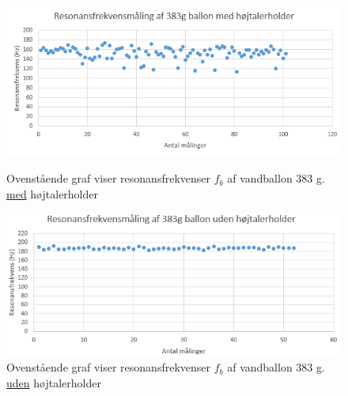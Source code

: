 {\begin{figure}[htbp]
  \begin{minipage}[b]{1\linewidth}
    \centering
    \includegraphics[width=\linewidth]{ballon383g(m_holder)}
    \caption{Ovenstående graf viser resonansfrekvenser $f_{b}$  af vandballon 383 g. \underline{med} højtalerholder}
    \label{fig:ballon216g(m_holder)}
    \label{fig:ballon383g(m_holder)}
  \end{minipage}
  \hspace{1cm}
  \begin{minipage}[b]{1\linewidth}
    \centering
    \includegraphics[width=\linewidth]{ballon383g(u_holder)}
    \caption{Ovenstående graf viser resonansfrekvenser $f_{b}$  af vandballon 383 g. \underline{uden} højtalerholder}
    \label{fig:ballon383g(u_holder)}
  \end{minipage}
\end{figure}

}
